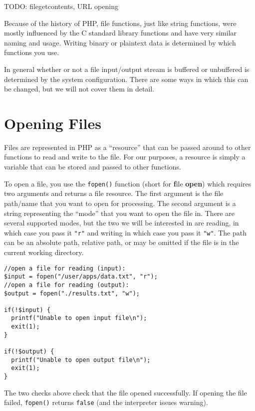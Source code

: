 

TODO: filegetcontents, URL opening

Because of the history of PHP, file functions, 
just like string functions, were mostly influenced
by the C standard library functions and have
very similar naming and usage.  Writing
binary or plaintext data is determined by which
functions you use.

In general whether or not a file input/output
stream is buffered or unbuffered is determined by
the system configuration.  There are some ways
in which this can be changed, but we will not 
cover them in detail.

\section{Opening Files}

Files are represented in PHP as a ``resource'' that
can be passed around to other functions to read and
write to the file.  For our purposes, a resource is
simply a variable that can be stored and passed
to other functions.  

To open a file, you use the \texttt{fopen()} 
function (short for \textbf{f}ile \textbf{open}) which
requires two arguments and returns a file resource.
The first argument is the file path/name that you want
to open for processing.  The second argument is a
string representing the ``mode'' that you want to open the
file in.  There are several supported modes, but the two 
we will be interested in are reading, in which case you
pass it \texttt{"r"} and writing in which case you
pass it \texttt{"w"}.  The path can be an absolute 
path, relative path, or may be omitted if the file is in the
current working directory.

\begin{verbatim}
//open a file for reading (input):
$input = fopen("/user/apps/data.txt", "r");
//open a file for reading (output):
$output = fopen("./results.txt", "w");

if(!$input) {
  printf("Unable to open input file\n");
  exit(1);
}

if(!$output) {
  printf("Unable to open output file\n");
  exit(1);
}
\end{verbatim}

The two checks above check that the file opened successfully.
If opening the file failed, \texttt{fopen()} returns
\texttt{false} (and the interpreter issues  warning).  

